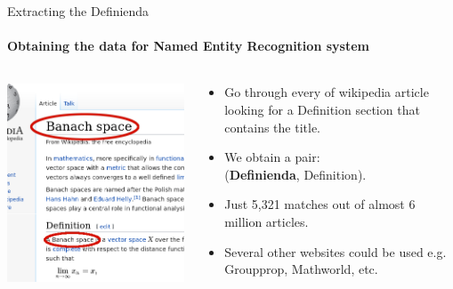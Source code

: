 \documentclass[10pt]{beamer}
\begin{document}
\begin{frame}{Extracting the Definienda}
    \framesubtitle{Obtaining the data for Named Entity Recognition system}
    \begin{columns}[T]
        \begin{column}{0.5\textwidth}
    \includegraphics[width=\textwidth]{wiki_thin_banach.png}
        \end{column}
        \begin{column}{0.5\textwidth}
            \begin{itemize}
            \item Go through every of wikipedia article looking for a Definition section that contains the title.
            \item We obtain a pair:\\
                (\textbf{Definienda},  Definition).
            \item Just 5,321 matches out of almost 6 million articles.
            \item Several other websites could be used e.g. Groupprop, Mathworld, etc.
            \end{itemize}
        \end{column}
    \end{columns}
\end{frame}
\end{document}
